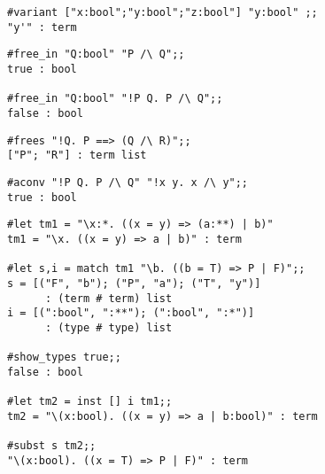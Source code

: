 
\vskip7mm



\vskip4mm
\begin{session}\begin{verbatim}
#variant ["x:bool";"y:bool";"z:bool"] "y:bool" ;;
"y'" : term
\end{verbatim}\end{session}


\vskip4mm
\begin{session}\begin{verbatim}
#free_in "Q:bool" "P /\ Q";;
true : bool

#free_in "Q:bool" "!P Q. P /\ Q";;
false : bool
\end{verbatim}\end{session}


\vskip4mm
\begin{session}\begin{verbatim}
#frees "!Q. P ==> (Q /\ R)";;
["P"; "R"] : term list
\end{verbatim}\end{session}

\vskip4mm
\begin{session}\begin{verbatim}
#aconv "!P Q. P /\ Q" "!x y. x /\ y";;
true : bool
\end{verbatim}\end{session}




\vskip4mm
\begin{session}\begin{verbatim}
#let tm1 = "\x:*. ((x = y) => (a:**) | b)"
tm1 = "\x. ((x = y) => a | b)" : term

#let s,i = match tm1 "\b. ((b = T) => P | F)";;
s = [("F", "b"); ("P", "a"); ("T", "y")] 
      : (term # term) list
i = [(":bool", ":**"); (":bool", ":*")] 
      : (type # type) list

#show_types true;;
false : bool

#let tm2 = inst [] i tm1;;
tm2 = "\(x:bool). ((x = y) => a | b:bool)" : term

#subst s tm2;;
"\(x:bool). ((x = T) => P | F)" : term
\end{verbatim}\end{session}

